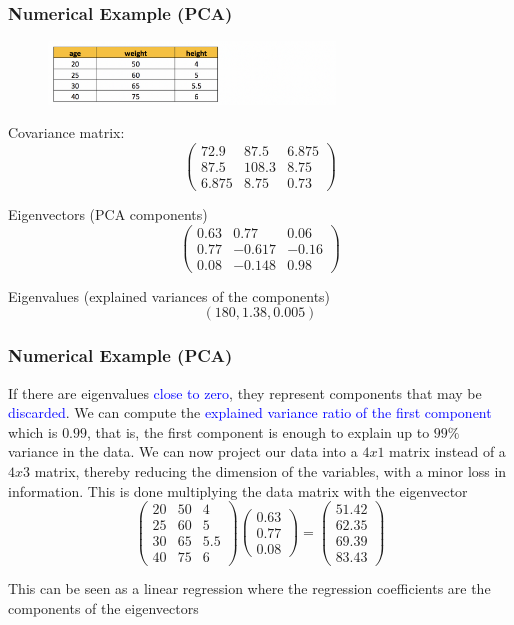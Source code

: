 \documentclass[11pt,aspectratio=169]{beamer}
\begin{document}
\begin{frame}
\frametitle{Numerical Example (PCA)}
\begin{small}
\begin{figure}
\includegraphics[width=3in]{img/table} 
\end{figure}
Covariance matrix:
$$\begin{pmatrix}
72.9&87.5&6.875  \\
87.5&108.3&8.75 \\
6.875&8.75&0.73
\end{pmatrix}$$

Eigenvectors (PCA components)
$$\begin{pmatrix}
0.63&0.77&0.06 \\
0.77&-0.617&-0.16 \\
0.08&-0.148&0.98
\end{pmatrix}$$

Eigenvalues (explained variances of the  components)
$$
(180, 1.38, 0.005)
$$

\end{small}
\end{frame}


\begin{frame}
\frametitle{Numerical  Example (PCA)}
\begin{small}
If there are eigenvalues \textcolor{blue}{close to zero}, they represent components that may be \textcolor{blue}{discarded}.
\vskip 10pt
 We can compute  the \textcolor{blue}{explained variance ratio of the first component} which is $0.99$, that is, the first component is enough to explain up to $99\%$ variance in the data. 
\vskip 10pt
We can now project our data into a $4x1$ matrix instead of a $4x3$ matrix, thereby reducing the dimension of the variables, with a minor loss in information.
\vskip 10pt
This is done multiplying the  data matrix with the eigenvector
$$\begin{pmatrix}
20&50&4  \\
25&60&5 \\
30&65&5.5 \\
40&75&6
\end{pmatrix}
\begin{pmatrix}
0.63\\
0.77\\
0.08
\end{pmatrix}=\begin{pmatrix}
51.42  \\
62.35 \\
69.39\\
83.43
\end{pmatrix}
$$
\begin{tiny}This can be seen  as a linear regression where  the  regression coefficients are the  components of the eigenvectors\end{tiny}

\end{small}
\end{frame}
\end{document}
